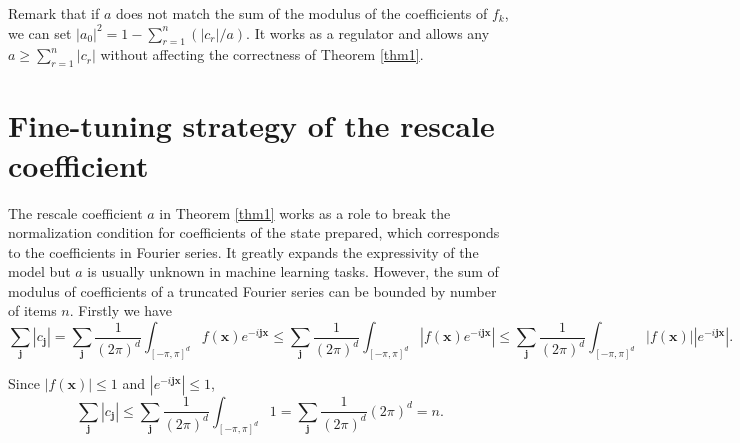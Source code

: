 \documentclass{article}
\theoremstyle{plain}
\theoremstyle{definition}
\theoremstyle{remark}
\begin{document}
Remark that if $a$ does not match the sum of the modulus of the coefficients of $f_k$, we can set $|a_0|^2=1-\sum_{r=1}^{n} (|c_r|/a)$. It works as a regulator and allows any $a\geq \sum_{r=1}^{n}|c_{r}|$ without affecting the correctness of Theorem \ref{thm1}. 




\section{Fine-tuning strategy of the rescale coefficient}\label{apd2}
The rescale coefficient $a$ in Theorem \ref{thm1} works as a role to break the normalization condition for coefficients of the state prepared, which corresponds to the coefficients in Fourier series. It greatly expands the expressivity of the model but $a$ is usually unknown in machine learning tasks. However, the sum of modulus of coefficients of a truncated Fourier series can be bounded by number of items $n$. Firstly we have
\begin{equation*}
    \sum_{\boldsymbol{j}} |c_{\boldsymbol{j}}| 
    = \sum_{\boldsymbol{j}}\frac{1}{(2\pi)^d}\int_{[-\pi,\pi]^d}f(\boldsymbol{x})e^{-i\boldsymbol{j}\boldsymbol{x}} 
    \leq \sum_{\boldsymbol{j}}\frac{1}{(2\pi)^d}\int_{[-\pi,\pi]^d}|f(\boldsymbol{x})e^{-i\boldsymbol{j}\boldsymbol{x}}| 
    \leq \sum_{\boldsymbol{j}}\frac{1}{(2\pi)^d}\int_{[-\pi,\pi]^d}|f(\boldsymbol{x})||e^{-i\boldsymbol{j}\boldsymbol{x}}|. 
\end{equation*}

Since $|f(\boldsymbol{x})|\leq 1$ and $|e^{-i\boldsymbol{j}\boldsymbol{x}}|\leq 1$, 
\begin{equation*}
    \sum_{\boldsymbol{j}} |c_{\boldsymbol{j}}| 
    \leq \sum_{\boldsymbol{j}}\frac{1}{(2\pi)^d}\int_{[-\pi,\pi]^d} 1 
    = \sum_{\boldsymbol{j}}\frac{1}{(2\pi)^d} (2\pi)^d
    = n.
\end{equation*}
\end{document}
